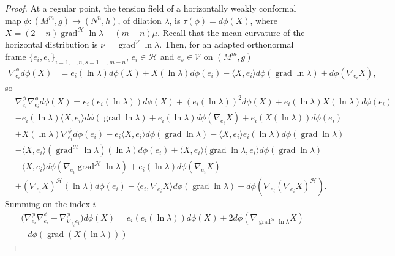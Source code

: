 \documentclass[12pt]{amsart}
\theoremstyle{plain}
\theoremstyle{definition}
\begin{document}
\begin{proof}
At a regular point, the tension field of a horizontally weakly conformal map $\phi :
(M^m ,g) \to (N^n ,h)$, of dilation $\lambda$, is $\tau(\phi) = d\phi(X)$, where $X=
(2-n)\operatorname{grad}^{\mathcal{H}}\ln \lambda - (m-n)\mu$. Recall that the mean curvature of the horizontal
distribution is $\nu = \operatorname{grad}^{\mathcal{V}} \ln\lambda$. Then, for an adapted orthonormal frame
$\{e_{i}, e_{s}\}_{i=1,\dots,n, s=1,\dots,m-n}$, $e_{i} \in {\mathcal{H}}$ and $e_{s} \in {\mathcal{V}}$ on
$(M^m ,g)$
\begin{align*}
\nabla^{\phi}_{e_{i}} d\phi(X)
&= e_{i}(\ln \lambda) d\phi(X) + X(\ln \lambda) d\phi(e_{i}) - \langle X,e_{i}\rangle
d\phi(\operatorname{grad} \ln \lambda) + d\phi(\nabla_{e_{i}}X) ,
\end{align*}
so
\begin{align*}
&\nabla^{\phi}_{e_{i}} \nabla^{\phi}_{e_{i}} d\phi(X) 
= e_{i}(e_{i}(\ln \lambda)) d\phi(X) + (e_{i}(\ln \lambda))^2 d\phi(X) + e_{i}(\ln \lambda)X(\ln \lambda)d\phi(e_{i}) \\
&-e_{i}(\ln \lambda)\langle X,e_{i} \rangle d\phi(\operatorname{grad}\ln \lambda)
+ e_{i}(\ln \lambda)d\phi(\nabla_{e_{i}}X) + e_{i}(X(\ln\lambda))d\phi(e_{i}) \\
&+ X(\ln\lambda) \nabla^{\phi}_{e_{i}} d\phi(e_{i}) - e_{i}\langle X,e_{i} \rangle
d\phi(\operatorname{grad}\ln \lambda)
- \langle X,e_{i} \rangle e_{i}(\ln \lambda) d\phi(\operatorname{grad}\ln \lambda) \\
&- \langle X,e_{i} \rangle (\operatorname{grad}^{\mathcal{H}}\ln \lambda) (\ln \lambda) d\phi(e_{i})
+ \langle X,e_{i} \rangle \langle \operatorname{grad}\ln\lambda ,e_{i} \rangle d\phi(\operatorname{grad}\ln \lambda) \\
&- \langle X,e_{i} \rangle d\phi(\nabla_{e_{i}} \operatorname{grad}^{\mathcal{H}}\ln\lambda) + e_{i}(\ln \lambda)d\phi(\nabla_{e_{i}}X) \\
&+ (\nabla_{e_{i}}X)^{\mathcal{H}}(\ln\lambda)d\phi(e_{i}) - \langle e_{i},\nabla_{e_{i}}X
\rangle d\phi(\operatorname{grad}\ln\lambda) + d\phi(\nabla_{e_{i}}(\nabla_{e_{i}}X)^{\mathcal{H}}) .
\end{align*}
Summing on the index $i$
\begin{align*}
&\big( \nabla^{\phi}_{e_{i}} \nabla^{\phi}_{e_{i}} -
\nabla^{\phi}_{\nabla_{e_{i}}e_{i}}\big) d\phi(X) =
e_{i}(e_{i}(\ln \lambda)) d\phi(X) + 2 d\phi(\nabla_{\operatorname{grad}^{\mathcal{H}} \ln\lambda} X) \\
&+ d\phi(\operatorname{grad} (X(\ln\lambda))) 

\end{align*}
\end{proof}
\end{document}
